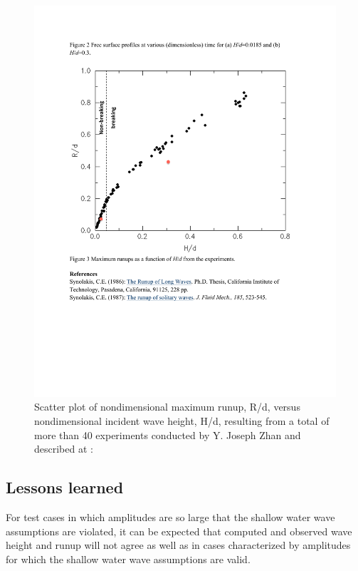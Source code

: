 \begin{figure}[ht]
\hfil\includegraphics[width=5.0in]{bp4/bp4maxrscatter.pdf}\hfil
\caption{\label{bp4maxrscatter} 
Scatter plot of nondimensional maximum runup, R/d, versus nondimensional incident wave height, H/d, resulting from a total of more than 40 experiments conducted by Y. Joseph Zhan and described at \cite{bp-description}:\\
}
\end{figure}

\subsection{Lessons learned}

For test cases in which amplitudes are so large that the shallow water wave assumptions are violated, it can be expected that computed and observed wave height and runup will not agree as well as in cases characterized by amplitudes for which the shallow water wave assumptions are valid.

